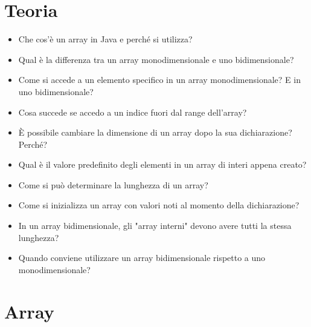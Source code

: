 \documentclass{article}
\begin{document}
\section{Teoria}

\begin{itemize}
    \item Che cos'è un array in Java e perché si utilizza?
    \item Qual è la differenza tra un array monodimensionale e uno bidimensionale?
    \item Come si accede a un elemento specifico in un array monodimensionale? E in uno bidimensionale?
    \item Cosa succede se accedo a un indice fuori dal range dell'array?
    \item È possibile cambiare la dimensione di un array dopo la sua dichiarazione? Perché?
    \item Qual è il valore predefinito degli elementi in un array di interi appena creato?
    \item Come si può determinare la lunghezza di un array?
    \item Come si inizializza un array con valori noti al momento della dichiarazione?
    \item In un array bidimensionale, gli "array interni" devono avere tutti la stessa lunghezza? 
    \item Quando conviene utilizzare un array bidimensionale rispetto a uno monodimensionale?
\end{itemize}

\section{Array}
\end{document}
